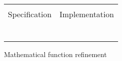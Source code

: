 \begin{figure}
  \centering
  \begin{tabular}[c]{c|c}
    \hline \\
    Specification & Implementation \\
    \hline\hline \\ \\
    \begin{subfigure}[c]{0.5\textwidth}
     
      \label{fig:prepost1}
    \end{subfigure}
    &
    \begin{subfigure}[c]{0.5\textwidth}
      
      \label{fig:prepost2}
    \end{subfigure}
    \\ \\
    \hline
  \end{tabular}    
  \caption{Mathematical function refinement}
  \label{fig:prepost}
\end{figure}